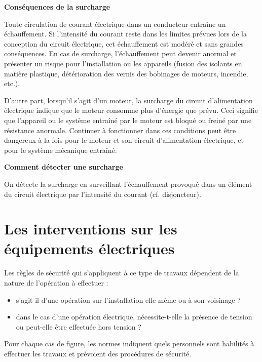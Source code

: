 \vspace{0.3cm}
\textbf{Conséquences de la surcharge}
\vspace{0.3cm}

Toute circulation de courant électrique dans un conducteur entraîne un échauffement. Si l’intensité du courant reste dans les limites prévues lors de la conception du circuit électrique, cet échauffement est modéré et sans grandes conséquences. En cas de surcharge, l’échauffement peut devenir anormal et présenter un risque pour l’installation ou les appareils (fusion des isolants en matière plastique, détérioration des vernis des bobinages de moteurs, incendie, etc.).
\vspace{0.3cm}


D’autre part, lorsqu’il s’agit d’un moteur, la surcharge du circuit d’alimentation électrique indique que le moteur consomme plus d’énergie que prévu. Ceci signifie que l’appareil ou le système entraîné par le moteur est bloqué ou freiné par une résistance anormale. Continuer à fonctionner dans ces conditions peut être dangereux à la fois pour le moteur et son circuit d’alimentation électrique, et pour le système mécanique entraîné.

\vspace{0.3cm}
\textbf{Comment détecter une surcharge}
\vspace{0.3cm}

On détecte la surcharge en surveillant l’échauffement provoqué dans un élément du circuit électrique par l’intensité du courant (cf. disjoncteur).



\section{Les interventions sur les équipements électriques}


Les règles de sécurité qui s’appliquent à ce type de travaux dépendent de la nature de l’opération à effectuer :
\begin{itemize}

\item  s’agit-il d’une opération sur l’installation elle-même ou à son voisinage ?
\item  dans le cas d’une opération électrique, nécessite-t-elle la présence de tension ou peut-elle être effectuée hors tension ?


\end{itemize}


Pour chaque cas de figure, les normes indiquent quels personnels sont habilités à effectuer les travaux et prévoient des procédures de sécurité.
\vspace{0.3cm}

